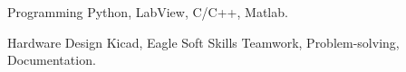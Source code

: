 

\begin{cvskills}

  \cvskill
    {Programming} %
    {Python, LabView, C/C++, Matlab.} %

  \cvskill
    {Hardware Design} %
    {Kicad, Eagle} %
  \cvskill
    {Soft Skills} %
    {Teamwork, Problem-solving, Documentation.} %

\end{cvskills}
